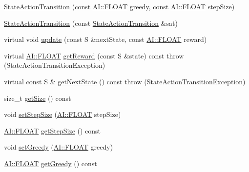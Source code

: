 \begin{DoxyCompactItemize}
\item 
\hyperlink{classAI_1_1Algorithm_1_1StateActionTransition_a0ff25726bd2c09a8d712de3fa66e541e}{State\+Action\+Transition} (const \hyperlink{namespaceAI_a41b74884a20833db653dded3918e05c3}{A\+I\+::\+F\+L\+O\+A\+T} greedy, const \hyperlink{namespaceAI_a41b74884a20833db653dded3918e05c3}{A\+I\+::\+F\+L\+O\+A\+T} step\+Size)
\item 
\hyperlink{classAI_1_1Algorithm_1_1StateActionTransition_a0b8cbca426faed815fc8389f08fe6b2c}{State\+Action\+Transition} (const \hyperlink{classAI_1_1Algorithm_1_1StateActionTransition}{State\+Action\+Transition} \&sat)
\item 
virtual void \hyperlink{classAI_1_1Algorithm_1_1StateActionTransition_a2e9b2a001f4199950f58429206a201e9}{update} (const S \&next\+State, const \hyperlink{namespaceAI_a41b74884a20833db653dded3918e05c3}{A\+I\+::\+F\+L\+O\+A\+T} reward)
\item 
virtual \hyperlink{namespaceAI_a41b74884a20833db653dded3918e05c3}{A\+I\+::\+F\+L\+O\+A\+T} \hyperlink{classAI_1_1Algorithm_1_1StateActionTransition_a73143dd7a80b3fb58ed0be0bb2962cd5}{get\+Reward} (const S \&state) const   throw (\+State\+Action\+Transition\+Exception)
\item 
virtual const S \& \hyperlink{classAI_1_1Algorithm_1_1StateActionTransition_a6f01c803796976ee877ac254a5698146}{get\+Next\+State} () const   throw (\+State\+Action\+Transition\+Exception)
\item 
size\+\_\+t \hyperlink{classAI_1_1Algorithm_1_1StateActionTransition_ae55f6b156e658e97688974ecad7cbcd1}{get\+Size} () const 
\item 
void \hyperlink{classAI_1_1Algorithm_1_1StateActionTransition_a50a3623dd0251375be981b3ac661df7d}{set\+Step\+Size} (\hyperlink{namespaceAI_a41b74884a20833db653dded3918e05c3}{A\+I\+::\+F\+L\+O\+A\+T} step\+Size)
\item 
\hyperlink{namespaceAI_a41b74884a20833db653dded3918e05c3}{A\+I\+::\+F\+L\+O\+A\+T} \hyperlink{classAI_1_1Algorithm_1_1StateActionTransition_ab0b343006fd9e43d986f4fcef9dee088}{get\+Step\+Size} () const 
\item 
void \hyperlink{classAI_1_1Algorithm_1_1StateActionTransition_af3fa54d2864692a5a55d4b9c1052349b}{set\+Greedy} (\hyperlink{namespaceAI_a41b74884a20833db653dded3918e05c3}{A\+I\+::\+F\+L\+O\+A\+T} greedy)
\item 
\hyperlink{namespaceAI_a41b74884a20833db653dded3918e05c3}{A\+I\+::\+F\+L\+O\+A\+T} \hyperlink{classAI_1_1Algorithm_1_1StateActionTransition_ad0afc4d202431930ab10c0514fd606dd}{get\+Greedy} () const 
\end{DoxyCompactItemize}


